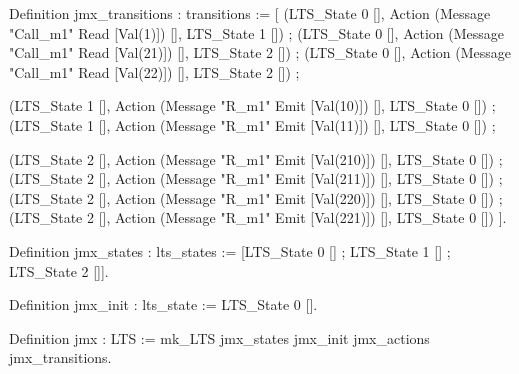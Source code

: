 Definition jmx_transitions : transitions :=
  [ (LTS_State 0 [], Action (Message "Call_m1" Read [Val(1)])  [], LTS_State 1 []) ;
    (LTS_State 0 [], Action (Message "Call_m1" Read [Val(21)]) [], LTS_State 2 []) ;
    (LTS_State 0 [], Action (Message "Call_m1" Read [Val(22)]) [], LTS_State 2 []) ;
  
    (LTS_State 1 [], Action (Message "R_m1" Emit [Val(10)]) [], LTS_State 0 []) ; 
    (LTS_State 1 [], Action (Message "R_m1" Emit [Val(11)]) [], LTS_State 0 []) ; 

    (LTS_State 2 [], Action (Message "R_m1" Emit [Val(210)]) [], LTS_State 0 []) ;
    (LTS_State 2 [], Action (Message "R_m1" Emit [Val(211)]) [], LTS_State 0 []) ;
    (LTS_State 2 [], Action (Message "R_m1" Emit [Val(220)]) [], LTS_State 0 []) ;
    (LTS_State 2 [], Action (Message "R_m1" Emit [Val(221)]) [], LTS_State 0 []) 
  ].

Definition jmx_states : lts_states := 
  [LTS_State 0 [] ; LTS_State 1 [] ; LTS_State 2 []].

Definition jmx_init : lts_state := LTS_State 0 [].

Definition jmx : LTS := 
  mk_LTS jmx_states jmx_init jmx_actions jmx_transitions.